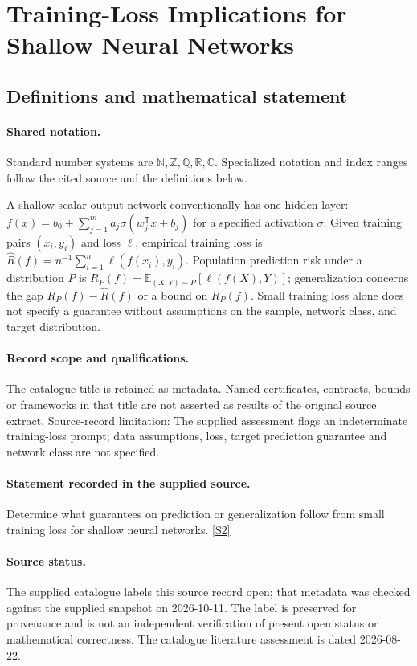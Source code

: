 \documentclass[11pt]{article}
\newcommand{\sref}[2]{\hyperlink{source:#1:#2}{[S#2]}}
\begin{document}
\section{Training-Loss Implications for Shallow Neural Networks}\label{statement}

\subsection{Definitions and mathematical statement}

\paragraph{Shared notation.}Standard number systems are $\mathbb N,\mathbb Z,\mathbb Q,\mathbb R,\mathbb C$. Specialized notation and index ranges follow the cited source and the definitions below.


A shallow scalar-output network conventionally has one hidden layer: $f(x)=b_0+\sum_{j=1}^m a_j\sigma(w_j^{\mathsf T}x+b_j)$ for a specified activation $\sigma$. Given training pairs $(x_i,y_i)$ and loss $\ell$, empirical training loss is $\widehat R(f)=n^{-1}\sum_{i=1}^n\ell(f(x_i),y_i)$. Population prediction risk under a distribution $P$ is $R_P(f)=\mathbb E_{(X,Y)\sim P}[\ell(f(X),Y)]$; generalization concerns the gap $R_P(f)-\widehat R(f)$ or a bound on $R_P(f)$. Small training loss alone does not specify a guarantee without assumptions on the sample, network class, and target distribution.
\paragraph{Record scope and qualifications.}
The catalogue title is retained as metadata. Named certificates, contracts, bounds or frameworks in that title are not asserted as results of the original source extract.
Source-record limitation: The supplied assessment flags an indeterminate training-loss prompt; data assumptions, loss, target prediction guarantee and network class are not specified.
\paragraph{Statement recorded in the supplied source.}
Determine what guarantees on prediction or generalization follow from small training loss for shallow neural networks. \sref{statement}{2}
\paragraph{Source status.}
The supplied catalogue labels this source record open; that metadata was checked against the supplied snapshot on 2026-10-11. The label is preserved for provenance and is not an independent verification of present open status or mathematical correctness. The catalogue literature assessment is dated 2026-08-22.
\end{document}
